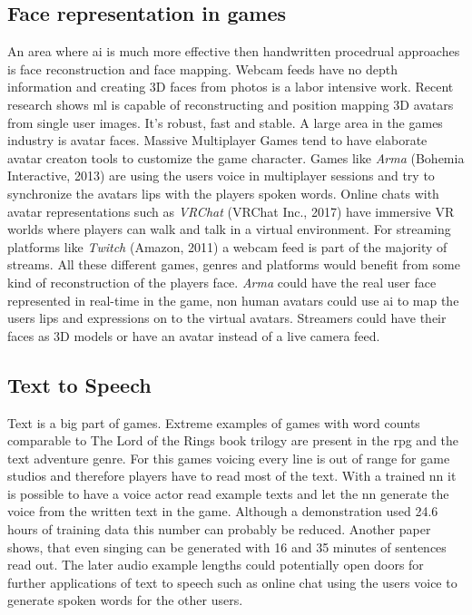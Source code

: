 \documentclass[10pt,a4paper]{article}
\begin{document}
\subsection{Face representation in games}
An area where \gls{ai} is much more effective then handwritten procedrual approaches is face reconstruction and face mapping. Webcam feeds have no depth information and creating 3D faces from photos is a labor intensive work. Recent research shows \gls{ml} is capable of reconstructing and position mapping 3D avatars from single user images. It's robust, fast and stable\cite{Feng2018}. A large area in the games industry is avatar faces. Massive Multiplayer Games tend to have elaborate avatar creaton tools to customize the game character. Games like \textit{Arma} (Bohemia Interactive, 2013) are using the users voice in multiplayer sessions and try to synchronize the avatars lips with the players spoken words. Online chats with avatar representations such as \textit{VRChat} (VRChat Inc., 2017) have immersive VR worlds where players can walk and talk in a virtual environment. For streaming platforms like \textit{Twitch} (Amazon, 2011) a webcam feed is part of the majority of streams. All these different games, genres and platforms would benefit from some kind of reconstruction of the players face. \textit{Arma} could have the real user face represented in real-time in the game, non human avatars could use \gls{ai} to map the users lips and expressions on to the virtual avatars. Streamers could have their faces as 3D models or have an avatar instead of a live camera feed.

\subsection{Text to Speech}
Text is a big part of games. Extreme examples of games with word counts comparable to The Lord of the Rings book trilogy are present in the \gls{rpg} and the text adventure genre. For this games voicing every line is out of range for game studios and therefore players have to read most of the text. With a trained \gls{nn} it is possible to have a voice actor read example texts and let the \gls{nn} generate the voice from the written text in the game\cite{Shen2017}. Although a demonstration used 24.6 hours of training data this number can probably be reduced. Another paper shows, that even singing can be generated with 16 and 35 minutes of sentences read out\cite{Blaauw2017}. The later audio example lengths could potentially open doors for further applications of text to speech such as online chat using the users voice to generate spoken words for the other users.
\end{document}
